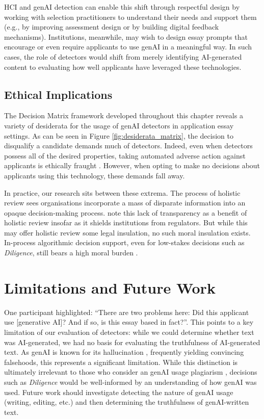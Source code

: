 HCI and genAI detection can enable this shift through respectful design \cite{VanKleek_Seymour_Binns_Shadbolt_2018} by working with selection practitioners to understand their needs and support them (e.g., by improving assessment design or by building digital feedback mechanisms). Institutions, meanwhile, may wish to design essay prompts that encourage or even require applicants to use genAI in a meaningful way. In such cases, the role of detectors would shift from merely identifying AI-generated content to evaluating how well applicants have leveraged these technologies.

\subsection{Ethical Implications}
The Decision Matrix framework developed throughout this chapter reveals a variety of desiderata for the usage of genAI detectors in application essay settings. As can be seen in Figure \ref{fig:desiderata_matrix}, the decision to disqualify a candidate demands much of detectors. Indeed, even when detectors possess all of the desired properties, taking automated adverse action against applicants is ethically fraught \cite{Lashkari_Cheng_2023}. However, when opting to make no decisions about applicants using this technology, these demands fall away.

In practice, our research sits between these extrema. The process of holistic review sees organisations incorporate a mass of disparate information into an opaque decision-making process. \textcite{hirschman_dequantifying_2016} note this lack of transparency as a benefit of holistic review insofar as it shields institutions from regulators. But while this may offer holistic review some legal insulation, no such moral insulation exists. In-process algorithmic decision support, even for low-stakes decisions such as \emph{Diligence}, still bears a high moral burden \cite{Lashkari_Cheng_2023}.

\section{Limitations and Future Work}
One participant highlighted: ``There are two problems here: Did this applicant use [generative AI]? And if so, is this essay based in fact?''. This points to a key limitation of our evaluation of detectors: while we could determine whether text was AI-generated, we had no basis for evaluating the truthfulness of AI-generated text. As genAI is known for its hallucination \cite{alkaissi_artificial_2023}, frequently yielding convincing falsehoods, this represents a significant limitation. While this distinction is ultimately irrelevant to those who consider an genAI usage plagiarism \cite{h_holden_thorp_chatgpt_2023}, decisions such as \emph{Diligence} would be well-informed by an understanding of how genAI was used. Future work should investigate detecting the nature of genAI usage (writing, editing, etc.) and then determining the truthfulness of genAI-written text.

